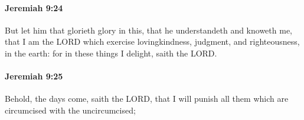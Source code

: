 		\paragraph{Jeremiah 9:24} %
			\label{JEREMIAH-9-24}

			But let him that glorieth glory in this, that he understandeth and knoweth me, that I am the LORD which exercise lovingkindness, judgment, and righteousness, in the earth: for in these things I delight, saith the LORD.


		\paragraph{Jeremiah 9:25} %
			\label{JEREMIAH-9-25}

			Behold, the days come, saith the LORD, that I will punish all them which are circumcised with the uncircumcised;


